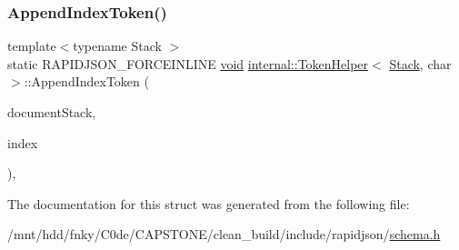 \subsubsection{\texorpdfstring{Append\+Index\+Token()}{AppendIndexToken()}}
{\footnotesize\ttfamily template$<$typename Stack $>$ \\
static R\+A\+P\+I\+D\+J\+S\+O\+N\+\_\+\+F\+O\+R\+C\+E\+I\+N\+L\+I\+NE \hyperlink{imgui__impl__opengl3__loader_8h_ac668e7cffd9e2e9cfee428b9b2f34fa7}{void} \hyperlink{structinternal_1_1TokenHelper}{internal\+::\+Token\+Helper}$<$ \hyperlink{classinternal_1_1Stack}{Stack}, char $>$\+::Append\+Index\+Token (\begin{DoxyParamCaption}\item[{\hyperlink{classinternal_1_1Stack}{Stack} \&}]{document\+Stack,  }\item[{\hyperlink{rapidjson_8h_a5ed6e6e67250fadbd041127e6386dcb5}{Size\+Type}}]{index }\end{DoxyParamCaption})\hspace{0.3cm}{\ttfamily [inline]}, {\ttfamily [static]}}



The documentation for this struct was generated from the following file\+:\begin{DoxyCompactItemize}
\item 
/mnt/hdd/fnky/\+C0de/\+C\+A\+P\+S\+T\+O\+N\+E/clean\+\_\+build/include/rapidjson/\hyperlink{schema_8h}{schema.\+h}\end{DoxyCompactItemize}
